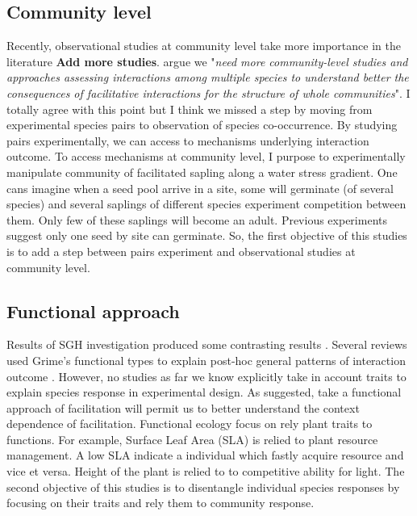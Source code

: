 \documentclass[12pt]{article} %
\begin{document}
\subsection{Community level}
Recently, observational studies at community level take more importance in the literature \citep{Soliveres2012, Gross2013, Soliveres2014b} \textbf{Add more studies}. 
\citet{Soliveres2014} argue we "\textit{need more community-level studies and approaches assessing interactions among multiple species to understand better the consequences of facilitative interactions for the structure of whole communities}". 
I totally agree with this point but I think we missed a step by moving from experimental species pairs to observation of species co-occurrence. By studying pairs experimentally, we can access to mechanisms underlying interaction outcome. 
To access mechanisms at community level, I purpose to experimentally manipulate community of facilitated sapling along a water stress gradient.
One cans imagine when a seed pool arrive in a site, some will germinate (of several species) and several saplings of different species experiment competition between them. Only few of these saplings will become an adult. Previous experiments suggest only one seed by site can germinate. So, the first objective of this studies is to add a step between pairs experiment and observational studies at community level.

\subsection{Functional approach}
Results of SGH investigation produced some contrasting results \citep{Maestre2009}. Several reviews used Grime's functional types to explain post-hoc general patterns of interaction outcome \citep{Maestre2009,Butterfield2013}. %
However, no studies as far we know explicitly take in account traits to explain species response in experimental design. As \citet{Butterfield2013} suggested, take a functional approach of facilitation will permit us to better understand the context dependence of facilitation. Functional ecology focus on rely plant traits to functions. 
For example, Surface Leaf Area (SLA) is relied to plant resource management. A low SLA indicate a individual which fastly acquire resource and vice et versa. Height of the plant is relied to to competitive ability for light. The second objective of this studies is to disentangle individual species responses by focusing on their traits and rely them to community response. 
\end{document}
